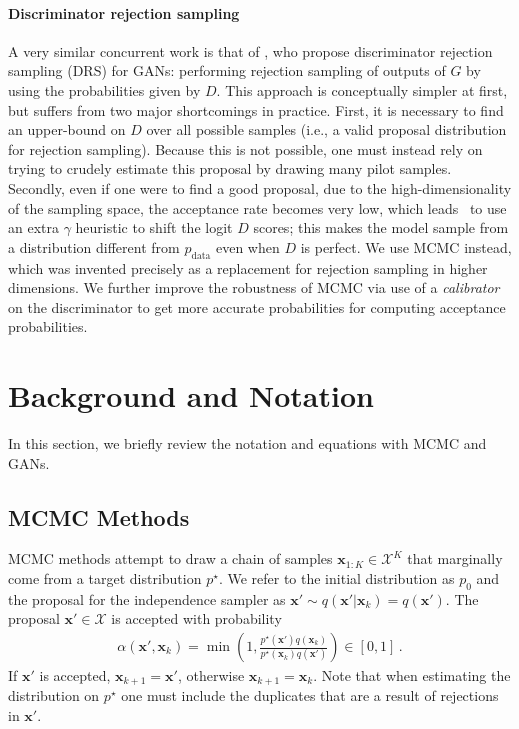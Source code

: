 \documentclass{article}
\renewcommand{\vec}[1]{{\boldsymbol{\mathbf{#1}}}} %
\newcommand{\set}[1]{\mathcal{#1}}
\newcommand{\sample}{\sim}
\newcommand{\given}{|}
\newcommand{\target}{{p^\star}}
\newcommand{\prop}{q}
\newcommand{\pinit}{{p_0}}
\newcommand{\PR}{{p_{\textrm{data}}}}
\newcommand{\accept}{\alpha}
\newcommand{\setx}{\set{X}}
\begin{document}
\paragraph{Discriminator rejection sampling}
A very similar concurrent work is that of \citet{Azadi2018}, who propose discriminator rejection sampling (DRS) for GANs: performing rejection sampling of outputs of $G$ by using the probabilities given by $D$.
This approach is conceptually simpler at first, but suffers from two major shortcomings in practice.
First, it is necessary to find an upper-bound on $D$ over all possible samples (i.e., a valid proposal distribution for rejection sampling)\@.
Because this is not possible, one must instead rely on trying to crudely estimate this proposal by drawing many pilot samples.
Secondly, even if one were to find a good proposal, due to the high-dimensionality of the sampling space, the acceptance rate becomes very low, which leads~\citet{Azadi2018} to use an extra $\gamma$ heuristic to shift the logit $D$ scores; this makes the model sample from a distribution different from $\PR$ even when $D$ is perfect.
We use MCMC instead, which was invented precisely as a replacement for rejection sampling in higher dimensions.
We further improve the robustness of MCMC via use of a \emph{calibrator} on the discriminator to get more accurate probabilities for computing acceptance probabilities.

\section{Background and Notation}
\label{sec:Background}

In this section, we briefly review the notation and equations with MCMC and GANs.

\subsection{MCMC Methods}
\label{sec:MCMC Methods}

MCMC methods attempt to draw a chain of samples $\vec x_{1:K} \in \setx^K$ that marginally come from a target distribution $\target$.
We refer to the initial distribution as $\pinit$ and the proposal for the independence sampler as $\vec x' \sample \prop(\vec x' \given \vec x_k)=\prop(\vec x')$.
The proposal $\vec x' \in \setx$ is accepted with probability
\begin{align}
  \accept(\vec x', \vec x_k) = \min\left(1, \frac{\target(\vec x')\prop(\vec x_k)}{\target(\vec x_k)\prop(\vec x')}\right) \in [0,1]\,. \label{eq:alpha def}
\end{align}
If $\vec x'$ is accepted, $\vec x_{k+1} = \vec x'$, otherwise $\vec x_{k+1} = \vec x_k$.
Note that when estimating the distribution on $\target$ one must include the duplicates that are a result of rejections in $\vec x'$.
\end{document}
